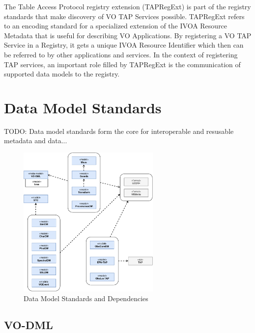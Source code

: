 \documentclass[11pt,a4paper]{ivoa}
\begin{document}
The Table Access Protocol registry extension (TAPRegExt) \citep{2012ivoa.spec.0827D} is part of the registry standards that make discovery of VO TAP Services possible.  
TAPRegExt refers to an encoding standard for a specialized extension of the IVOA Resource Metadata 
that is useful for describing VO Applications.  By registering a VO TAP Service in a Registry, it 
gets a unique IVOA Resource Identifier which then can be referred to by other applications and 
services.  In the context of registering TAP services, an important role filled by TAPRegExt is 
the communication of supported data models to the registry.

\section{Data Model Standards}

TODO: Data model standards form the core for interoperable and resusable metadata and data...

\begin{figure}
\centering
\includegraphics[width=0.62\textwidth]{ivoa-arch-dm.pdf}
\caption{Data Model Standards and Dependencies}
\label{fig:dmdeps}
\end{figure}

\subsection{VO-DML}
\end{document}
